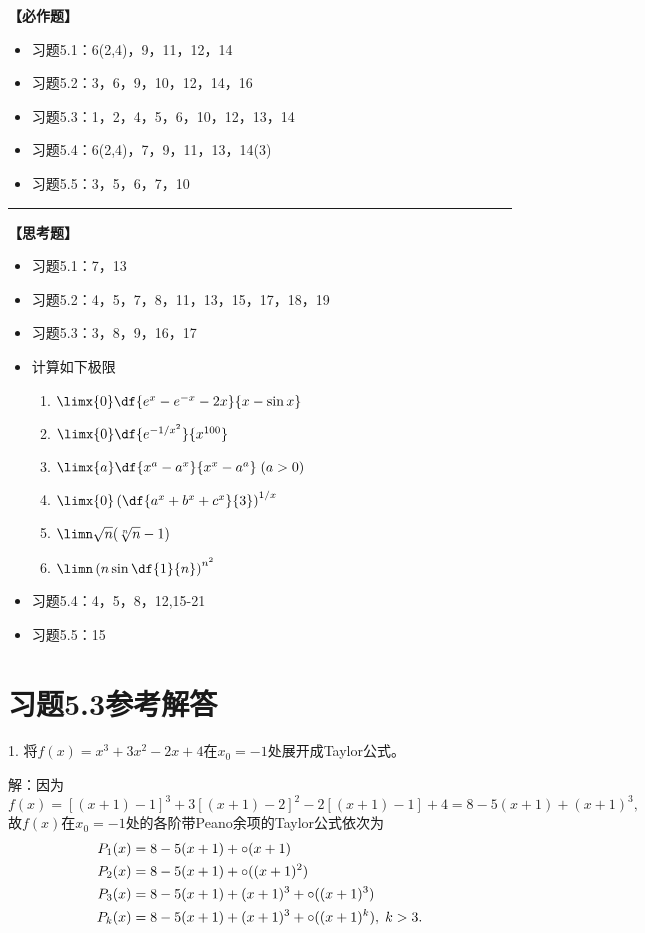 {\bf 【必作题】}

\begin{itemize}
  \item 习题5.1：6(2,4)，9，11，12，14
  \item 习题5.2：3，6，9，10，12，14，16
  \item 习题5.3：1，2，4，5，6，10，12，13，14
  \item 习题5.4：6(2,4)，7，9，11，13，14(3)
  \item 习题5.5：3，5，6，7，10
\end{itemize}

\bigskip

\hrule

\bigskip
\bigskip

{\bf 【思考题】}

\begin{itemize}
  \item 习题5.1：7，13
  \item 习题5.2：4，5，7，8，11，13，15，17，18，19
  \item 习题5.3：3，8，9，16，17
  \item 计算如下极限
  	\begin{enumerate}
	  \item $\limx{0}\df{e^x-e^{-x}-2x}{x-\sin x}$ 
	  \item $\limx{0}\df{e^{-1/x^2}}{x^{100}}$ 
	  \item $\limx{a}\df{x^a-a^x}{x^x-a^a}\;(a>0)$ 
	  \item $\limx{0}\left(\df{a^x+b^x+c^x}{3}\right)^{1/x}$ 
	  \item $\limn\sqrt{n}(\sqrt[n]{n}-1)$ 
	  \item $\limn\left(n\sin\df{1}{n}\right)^{n^2}$
	\end{enumerate}	
  \item 习题5.4：4，5，8，12,15-21
  \item 习题5.5：15
\end{itemize}

\newpage



\newpage

\section*{习题5.3参考解答}

1. 将$f(x)=x^3+3x^2-2x+4$在$x_0=-1$处展开成Taylor公式。

解：因为
$$f(x)=[(x+1)-1]^3+3[(x+1)-2]^2-2[(x+1)-1]+4
=8-5(x+1)+(x+1)^3,$$
故$f(x)$在$x_0=-1$处的各阶带Peano余项的Taylor公式依次为
\begin{align}
	P_1(x)&=8-5(x+1)+\circ(x+1)\notag\\
	P_2(x)&=8-5(x+1)+\circ((x+1)^2)\notag\\
	P_3(x)&=8-5(x+1)+(x+1)^3+\circ((x+1)^3)\notag\\
	P_k(x)&=8-5(x+1)+(x+1)^3+\circ((x+1)^k),\;k>3.\notag
\end{align}

